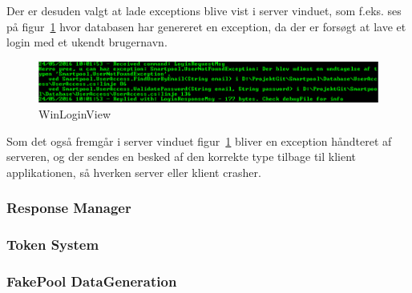 Der er desuden valgt at lade exceptions blive vist i server vinduet, som f.eks. ses på figur~\ref{fig:asynchronousSocketListenerException} hvor databasen har genereret en exception, da der er forsøgt at lave et login med et ukendt brugernavn.

\begin{figure}
	\centering
	\includegraphics[width=0.9\linewidth]{figs/connection/asynchronousSocketListenerException.png}
	\caption{WinLoginView}
	\label{fig:asynchronousSocketListenerException}
\end{figure}

Som det også fremgår i server vinduet figur~\ref{fig:asynchronousSocketListenerException} bliver en exception håndteret af serveren, og der sendes en besked af den korrekte type tilbage til klient applikationen, så hverken server eller klient crasher.

\subsubsection{Response Manager}

\subsubsection{Token System}

\subsubsection{FakePool DataGeneration}

